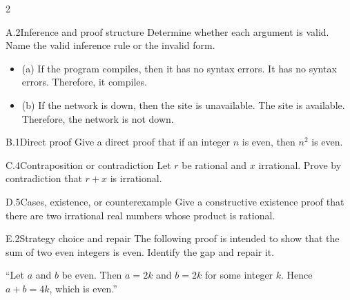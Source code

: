 \documentclass[9pt]{extarticle}
\begin{document}
\CoreWorkArea
\FormBreak
{}
\begin{multicols}{2}
\begin{CoreProblem}{A.2}{Inference and proof structure}
Determine whether each argument is valid. Name the valid inference rule or the invalid form.
\begin{itemize}
  \item (a) If the program compiles, then it has no syntax errors. It has no syntax errors. Therefore, it compiles.
  \item (b) If the network is down, then the site is unavailable. The site is
        available. Therefore, the network is not down.
\end{itemize}
\end{CoreProblem}
\begin{CoreProblem}{B.1}{Direct proof}
Give a direct proof that if an integer $n$ is even, then $n^2$ is even.
\end{CoreProblem}
\begin{CoreProblem}{C.4}{Contraposition or contradiction}
Let $r$ be rational and $x$ irrational. Prove by contradiction that $r+x$ is irrational.
\end{CoreProblem}
\columnbreak
\begin{CoreProblem}{D.5}{Cases, existence, or counterexample}
Give a constructive existence proof that there are two irrational real numbers
whose product is rational.
\end{CoreProblem}
\begin{CoreProblem}{E.2}{Strategy choice and repair}
The following proof is intended to show that the sum of two even integers is even. Identify the gap and repair it.

``Let $a$ and $b$ be even. Then $a=2k$ and $b=2k$ for some integer $k$. Hence $a+b=4k$, which is even.''
\end{CoreProblem}
\end{multicols}
\CoreWorkArea
\FormBreak
{}
\end{document}
